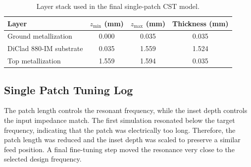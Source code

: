 \begin{table}[H]
\centering
\caption{Layer stack used in the final single-patch CST model.}
\label{tab:single-patch-layer-stack}
\small
\renewcommand{\arraystretch}{1.16}
\begin{tabular}{@{}lccc@{}}
\toprule
\textbf{Layer} & \textbf{$z_{\min}$ (mm)} & \textbf{$z_{\max}$ (mm)} & \textbf{Thickness (mm)} \\
\midrule
Ground metallization & 0.000 & 0.035 & 0.035 \\
DiClad 880-IM substrate & 0.035 & 1.559 & 1.524 \\
Top metallization & 1.559 & 1.594 & 0.035 \\
\bottomrule
\end{tabular}
\end{table}

\subsection{Single Patch Tuning Log}
\label{subsec:single-patch-run-plan}

The patch length controls the resonant frequency, while the inset depth controls the input impedance
match.  The first simulation resonated below the target frequency, indicating that the patch was
electrically too long.  Therefore, the patch length was reduced and the inset depth was scaled to
preserve a similar feed position.  A final fine-tuning step moved the resonance very close to the
selected design frequency.

